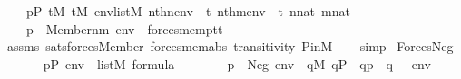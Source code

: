 \begin{isabellebody}
\ \ \ \ {\isachardoublequoteopen}p{\isasymin}P{\isachardoublequoteclose}\ {\isachardoublequoteopen}t{}{\isasymin}M{\isachardoublequoteclose}\ {\isachardoublequoteopen}t{}{\isasymin}M{\isachardoublequoteclose}\ {\isachardoublequoteopen}env{\isasymin}list{\isacharparenleft}{\kern0pt}M{\isacharparenright}{\kern0pt}{\isachardoublequoteclose}\ {\isachardoublequoteopen}nth{\isacharparenleft}{\kern0pt}n{\isacharcomma}{\kern0pt}env{\isacharparenright}{\kern0pt}\ {\isacharequal}{\kern0pt}\ t{}{\isachardoublequoteclose}\ {\isachardoublequoteopen}nth{\isacharparenleft}{\kern0pt}m{\isacharcomma}{\kern0pt}env{\isacharparenright}{\kern0pt}\ {\isacharequal}{\kern0pt}\ t{}{\isachardoublequoteclose}\ {\isachardoublequoteopen}n{\isasymin}nat{\isachardoublequoteclose}\ {\isachardoublequoteopen}m{\isasymin}nat{\isachardoublequoteclose}\ \isanewline
\ \ \isanewline
\ \ \ \ {\isachardoublequoteopen}{\isacharparenleft}{\kern0pt}p\ {\isasymtturnstile}\ Member{\isacharparenleft}{\kern0pt}n{\isacharcomma}{\kern0pt}m{\isacharparenright}{\kern0pt}\ env{\isacharparenright}{\kern0pt}\ {\isasymlongleftrightarrow}\ forces{\isacharunderscore}{\kern0pt}mem{\isacharparenleft}{\kern0pt}p{\isacharcomma}{\kern0pt}t{}{\isacharcomma}{\kern0pt}t{}{\isacharparenright}{\kern0pt}{\isachardoublequoteclose}\isanewline
%
\isadelimproof
\ \ \ %
\endisadelimproof
%
\isatagproof
{}\isamarkupfalse%
\ assms\ sats{\isacharunderscore}{\kern0pt}forces{\isacharunderscore}{\kern0pt}Member\ forces{\isacharunderscore}{\kern0pt}mem{\isacharunderscore}{\kern0pt}abs\ transitivity\ P{\isacharunderscore}{\kern0pt}in{\isacharunderscore}{\kern0pt}M\isanewline
\ \ \isamarkupfalse%
\ simp%
\endisatagproof
{\isafoldproof}%
%
\isadelimproof
\isanewline
%
\endisadelimproof
\isanewline
{}\isamarkupfalse%
\ Forces{\isacharunderscore}{\kern0pt}Neg{\isacharcolon}{\kern0pt}\isanewline
\ \ \isanewline
\ \ \ \ {\isachardoublequoteopen}p{\isasymin}P{\isachardoublequoteclose}\ {\isachardoublequoteopen}env\ {\isasymin}\ list{\isacharparenleft}{\kern0pt}M{\isacharparenright}{\kern0pt}{\isachardoublequoteclose}\ {\isachardoublequoteopen}{\isasymphi}{\isasymin}formula{\isachardoublequoteclose}\ \isanewline
\ \ \isanewline
\ \ \ \ {\isachardoublequoteopen}{\isacharparenleft}{\kern0pt}p\ {\isasymtturnstile}\ Neg{\isacharparenleft}{\kern0pt}{\isasymphi}{\isacharparenright}{\kern0pt}\ env{\isacharparenright}{\kern0pt}\ {\isasymlongleftrightarrow}\ {\isasymnot}{\isacharparenleft}{\kern0pt}{\isasymexists}q{\isasymin}M{\isachardot}{\kern0pt}\ q{\isasymin}P\ {\isasymand}\ q{\isasympreceq}p\ {\isasymand}\ {\isacharparenleft}{\kern0pt}q\ {\isasymtturnstile}\ {\isasymphi}\ env{\isacharparenright}{\kern0pt}{\isacharparenright}{\kern0pt}{\isachardoublequoteclose}\isanewline

\end{isabellebody}
